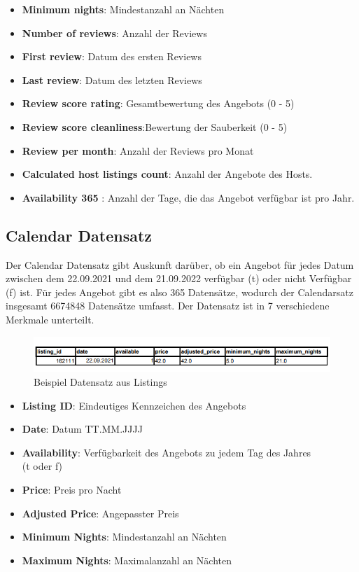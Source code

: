 \documentclass[12pt]{article}
\begin{document}
\begin{text}
\begin{itemize}
    \item \textbf{Minimum nights}: Mindestanzahl an Nächten
    \item \textbf{Number of reviews}: Anzahl der Reviews
    \item \textbf{First review}: Datum des ersten Reviews
    \item \textbf{Last review}: Datum des letzten Reviews
    \item \textbf{Review score rating}: Gesamtbewertung des Angebots (0 - 5)
    \item \textbf{Review score cleanliness}:Bewertung der Sauberkeit (0 - 5)
    \item \textbf{Review per month}: Anzahl der Reviews pro Monat
    \item \textbf{Calculated host listings count}: Anzahl der Angebote des Hosts.
    \item \textbf{Availability 365 }: Anzahl der Tage, die das Angebot verfügbar ist pro Jahr.
    
    
\end{itemize}

\newpage
\subsection{Calendar Datensatz}
Der Calendar Datensatz gibt Auskunft darüber, ob ein Angebot für jedes Datum zwischen dem 22.09.2021 und dem 21.09.2022 verfügbar (t) oder nicht Verfügbar (f) ist. Für jedes Angebot gibt es also 365 Datensätze, wodurch der Calendarsatz insgesamt 6674848 Datensätze umfasst. Der Datensatz ist in 7 verschiedene Merkmale unterteilt.


\begin{figure}[h]
 \includegraphics[width=1\textwidth]{CalendarTabelleNeu.png}
 \caption{Beispiel Datensatz aus Listings}
\end{figure}

\begin{itemize}
    \item \textbf{Listing ID}: Eindeutiges Kennzeichen des Angebots
    \item \textbf{Date}: Datum TT.MM.JJJJ
    \item \textbf{Availability}: Verfügbarkeit des Angebots zu jedem Tag des Jahres \\ (t oder f)
    \item \textbf{Price}: Preis pro Nacht
    \item \textbf{Adjusted Price}: Angepasster Preis
    \item \textbf{Minimum Nights}: Mindestanzahl an Nächten
    \item \textbf{Maximum Nights}: Maximalanzahl an Nächten
\end{itemize}


\end{text}
\end{document}
